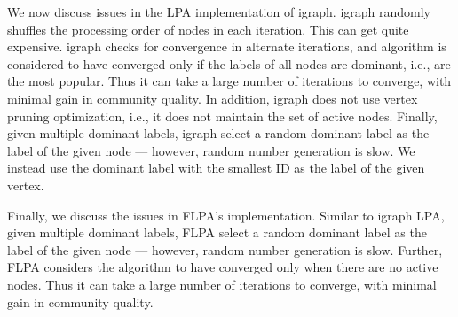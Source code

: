 We now discuss issues in the LPA implementation of igraph. igraph randomly shuffles the processing order of nodes in each iteration. This can get quite expensive. igraph checks for convergence in alternate iterations, and algorithm is considered to have converged only if the labels of all nodes are dominant, i.e., are the most popular. Thus it can take a large number of iterations to converge, with minimal gain in community quality. In addition, igraph does not use vertex pruning optimization, i.e., it does not maintain the set of active nodes. Finally, given multiple dominant labels, igraph select a random dominant label as the label of the given node --- however, random number generation is slow. We instead use the dominant label with the smallest ID as the label of the given vertex.

Finally, we discuss the issues in FLPA's implementation. Similar to igraph LPA, given multiple dominant labels, FLPA select a random dominant label as the label of the given node --- however, random number generation is slow. Further, FLPA considers the algorithm to have converged only when there are no active nodes. Thus it can take a large number of iterations to converge, with minimal gain in community quality.




